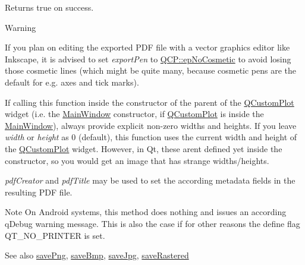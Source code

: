 Returns true on success.

\begin{DoxyWarning}{Warning}
\begin{DoxyItemize}
\item If you plan on editing the exported P\+DF file with a vector graphics editor like Inkscape, it is advised to set {\itshape export\+Pen} to \mbox{\hyperlink{namespace_q_c_p_a17844f19e1019693a953e1eb93536d2faae8fcfaafee234ce18558afef83f6a78}{Q\+C\+P\+::ep\+No\+Cosmetic}} to avoid losing those cosmetic lines (which might be quite many, because cosmetic pens are the default for e.\+g. axes and tick marks). \item If calling this function inside the constructor of the parent of the \mbox{\hyperlink{class_q_custom_plot}{Q\+Custom\+Plot}} widget (i.\+e. the \mbox{\hyperlink{class_main_window}{Main\+Window}} constructor, if \mbox{\hyperlink{class_q_custom_plot}{Q\+Custom\+Plot}} is inside the \mbox{\hyperlink{class_main_window}{Main\+Window}}), always provide explicit non-\/zero widths and heights. If you leave {\itshape width} or {\itshape height} as 0 (default), this function uses the current width and height of the \mbox{\hyperlink{class_q_custom_plot}{Q\+Custom\+Plot}} widget. However, in Qt, these aren\textquotesingle{}t defined yet inside the constructor, so you would get an image that has strange widths/heights.\end{DoxyItemize}
{\itshape pdf\+Creator} and {\itshape pdf\+Title} may be used to set the according metadata fields in the resulting P\+DF file.
\end{DoxyWarning}
\begin{DoxyNote}{Note}
On Android systems, this method does nothing and issues an according q\+Debug warning message. This is also the case if for other reasons the define flag {\ttfamily Q\+T\+\_\+\+N\+O\+\_\+\+P\+R\+I\+N\+T\+ER} is set.
\end{DoxyNote}
\begin{DoxySeeAlso}{See also}
\mbox{\hyperlink{class_q_custom_plot_ac92cc9256d12f354b40a4be4600b5fb9}{save\+Png}}, \mbox{\hyperlink{class_q_custom_plot_ae3a86ed0795670e50afa21759d4fa13d}{save\+Bmp}}, \mbox{\hyperlink{class_q_custom_plot_a76f0d278e630a711fa6f48048cfd83e4}{save\+Jpg}}, \mbox{\hyperlink{class_q_custom_plot_ad7723ce2edfa270632ef42b03a444352}{save\+Rastered}} 
\end{DoxySeeAlso}
\mbox{\label{class_q_custom_plot_ac92cc9256d12f354b40a4be4600b5fb9}} 
